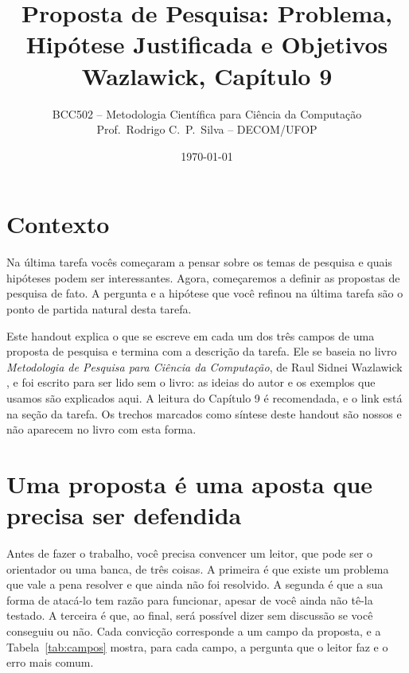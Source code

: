 \documentclass[10pt,a4paper]{extarticle}
\title{Proposta de Pesquisa: Problema, Hipótese Justificada e Objetivos\\Wazlawick, Capítulo 9}
\author{BCC502 -- Metodologia Científica para Ciência da Computação\\Prof.\ Rodrigo C.\ P.\ Silva -- DECOM/UFOP}
\date{\today}
\theoremstyle{definition}
\begin{document}
\maketitle
\thispagestyle{fancy}
\tableofcontents

\section*{Contexto}

Na última tarefa vocês começaram a pensar sobre os temas de pesquisa e quais hipóteses podem ser interessantes. Agora, começaremos a definir as propostas de pesquisa de fato. A pergunta e a hipótese que você refinou na última tarefa são o ponto de partida natural desta tarefa.

Este handout explica o que se escreve em cada um dos três campos de uma proposta de pesquisa e termina com a descrição da tarefa. Ele se baseia no livro \emph{Metodologia de Pesquisa para Ciência da Computação}, de Raul Sidnei Wazlawick \cite{wazlawick2020}, e foi escrito para ser lido sem o livro: as ideias do autor e os exemplos que usamos são explicados aqui. A leitura do Capítulo 9 é recomendada, e o link está na seção da tarefa. Os trechos marcados como síntese deste handout são nossos e não aparecem no livro com esta forma.

\section{Uma proposta é uma aposta que precisa ser defendida}\label{sec:aposta}

Antes de fazer o trabalho, você precisa convencer um leitor, que pode ser o orientador ou uma banca, de três coisas. A primeira é que existe um problema que vale a pena resolver e que ainda não foi resolvido. A segunda é que a sua forma de atacá-lo tem razão para funcionar, apesar de você ainda não tê-la testado. A terceira é que, ao final, será possível dizer sem discussão se você conseguiu ou não. Cada convicção corresponde a um campo da proposta, e a Tabela~\ref{tab:campos} mostra, para cada campo, a pergunta que o leitor faz e o erro mais comum.
\end{document}
